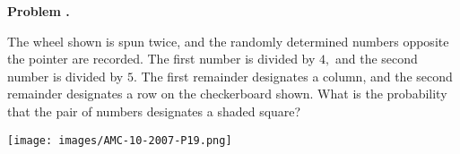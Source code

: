 \documentclass[11pt,letterpaper]{article}
\newcounter{problem}
\newcommand{\problem}{
	\stepcounter{problem}%
	\noindent \textbf{Problem \theproblem. }%
}
\begin{document}
\begin{minipage}{\textwidth}
     \problem

     \noindent The wheel shown is spun twice, and the randomly determined numbers opposite the pointer are recorded. The first number is divided by $4,$ and the second number is divided by $5.$ The first remainder designates a column, and the second remainder designates a row on the checkerboard shown. What is the probability that the pair of numbers designates a shaded square?

     \vspace{1cm}

     \texttt{[image: images/AMC-10-2007-P19.png]}   

\end{minipage}
\vspace{2cm}
\end{document}
